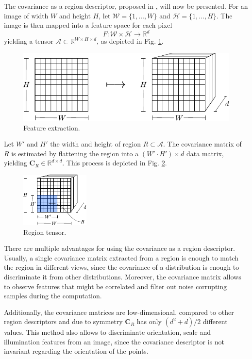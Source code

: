 \documentclass[11pt]{article}
\theoremstyle{definition}
\theoremstyle{remark}
\theoremstyle{remark}
\theoremstyle{remark}
\newcommand{\R}{{\mathbb{R}}}
\begin{document}
The covariance as a region descriptor, proposed in \parencite{tuzel2006}, will
now be presented. For an image of width $W$ and height $H$, let
$\mathcal{W}=\{1,\ldots,W\}$ and $\mathcal{H}=\{1,\ldots,H\}$. The image is then
mapped into a feature space for each pixel
%
\[
  F:\mathcal{W}\times\mathcal{H}\rightarrow\mathbb{R}^{d}
\]
%
yielding a tensor $\mathcal{A} \subset \R^{W \times H \times d}$, as depicted in
Fig. \ref{fig:feat_ext}.
%
\begin{figure}[H]
  \centering \includegraphics[width =
  0.6\linewidth]{figs/feature_extraction.pdf}
  \caption{Feature extraction.}
  \label{fig:feat_ext}
\end{figure}
%
Let $W'$ and $H'$ the width and height of region $R\subset\mathcal{A}$. The
covariance matrix of $R$ is estimated by flattening the region into a
$(W'\cdot H')\times d$ data matrix, yielding $\mathbf{C}_R \in \R^{d \times d}$.
This process is depicted in Fig. \ref{fig:region}.
%
\begin{figure}[H]
  \centering \includegraphics[width = 0.3\linewidth]{figs/region1.pdf}
  \caption{Region tensor.}
  \label{fig:region}
\end{figure}
%
There are multiple advantages for using the covariance as a region descriptor.
Usually, a single covariance matrix extracted from a region is enough to match
the region in different views, since the covariance of a distribution is enough
to discriminate it from other distributions. Moreover, the covariance matrix
allows to observe features that might be correlated and filter out noise
corrupting samples during the computation.

Additionally, the covariance matrices are low-dimensional, compared to other
region descriptors and due to symmetry $\mathbf{C}_{R}$ has only
$\left(d^{2}+d\right) / 2$ different values. This method also allows to
discriminate orientation, scale and illumination features from an image, since
the covariance descriptor is not invariant regarding the orientation of the
points.
\end{document}
